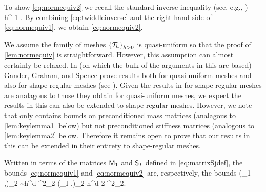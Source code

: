 To show \cref{eq:normequiv2} we recall the standard inverse inequality (see, e.g., \cite[Theorem 4.5.11 and Remark 4.5.20]{BrSc:08})
\beq\label{eq:twiddleinverse}
\NHoD{\vh} \lesssim h^{-1} \NLtD{\vh}.
\eeq
By combining \cref{eq:twiddleinverse} and the right-hand side of \cref{eq:normequiv1}, we obtain \cref{eq:normequiv2}.
\epf

\label{rem:ggsqu}
We assume the family of meshes $\set{\Th}_{h>0}$ is quasi-uniform so that the proof of \cref{lem:normequiv} is straightforward. However, this assumption can almost certainly be relaxed. In \cite{GaGrSp:15} (on which the bulk of the arguments in this  are based) Gander, Graham, and Spence prove results both for quasi-uniform meshes and also for shape-regular meshes (see \cite[Section 3.4 and 4.1.2]{GaGrSp:15}). Given the results in \cite{GaGrSp:15} for shape-regular meshes are analagous to those they obtain for quasi-uniform meshes, we expect the results in this  can also be extended to shape-regular meshes. However, we note that \cite{GaGrSp:15} only contains bounds on preconditioned mass matrices (analagous to \cref{lem:keylemma1} below) but not preconditioned stiffness matrices (analogous to \cref{lem:keylemma2} below. Therefore it remains open to prove that our results in this  can be extended in their entirety to shape-regular meshes.
\ere

Written in terms of the matrices $\mathsf{M}_1$ and $\mathsf{S}_I$ defined in \cref{eq:matrixSjdef}, the bounds \cref{eq:normequiv1} and \cref{eq:normequiv2} are, respectively, the bounds
\beqs
(\Mmat_1 \vvec,\vvec)_2 \sim h^d \N{\vvec}^2_2 \quad\tand\quad (\Smat_I \vvec,\vvec)_2 \lesssim h^{d-2} \N{\vvec}^2_2.
\eeqs




